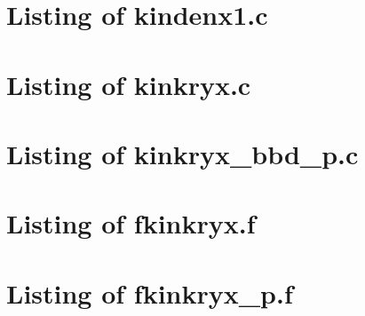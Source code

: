 
\lstset{language=C}

\newpage
\section{Listing of kindenx1.c}\label{s:kindenx1_c}

\newpage
\section{Listing of kinkryx.c}\label{s:kinkryx_c}

\newpage
\section{Listing of kinkryx\_bbd\_p.c}\label{s:kinkryx_bbd_p_c}


\lstset{language=[77]Fortran}

\newpage
\section{Listing of fkinkryx.f}\label{s:fkinkryx_f}

\newpage
\section{Listing of fkinkryx\_p.f}\label{s:fkinkryx_p_f}



